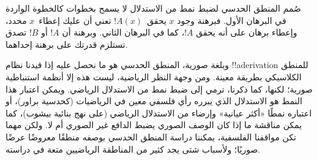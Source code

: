 \documentclass[../../../include/open-logic-section]{subfiles}
\begin{document}
صُمم المنطق الحدسي لضبط نمط من الاستدلال لا يسمح بخطوات كالخطوة
الواردة في البرهان الأول. فبرهنة وجود $x$ يحقق~$!A(x)$ تعني أن عليك
إعطاء~$x$ محدد، وإعطاء برهان على أنه يحقق $!A$، كما في البرهان الثاني.
وبرهنة أن $!A$ أو $!B$ تصدق تستلزم قدرتك على برهنة إحداهما.

وبلغة صورية، المنطق الحدسي هو ما نحصل عليه إذا قيدنا نظام
!!a{derivation} للمنطق الكلاسيكي بطريقة معينة. ومن وجهة النظر
الرياضية، ليست هذه إلا أنظمة استنباطية صورية؛ لكنها، كما ذكرنا، ترمي
إلى ضبط نمط من الاستدلال الرياضي. ويمكن اعتبار هذا النمط هو الاستدلال
الذي يبرره رأي فلسفي معين في الرياضيات (كحدسية براور)، أو اعتباره نمطًا
«أكثر عيانية» وإرضاء من الاستدلال الرياضي (على نهج بنائية بيشوب)، كما
يمكن مناقشة ما إذا كان الوصف الصوري يضبط الدافع غير الصوري أم لا.
ولكن مهما تكن مواقفنا الفلسفية، يمكننا دراسة المنطق الحدسي بوصفه
منطقًا معروضًا عرضًا صوريًا؛ ولأسباب شتى يجد كثير من المناطقة
الرياضيين متعة في دراسته.
\end{document}
